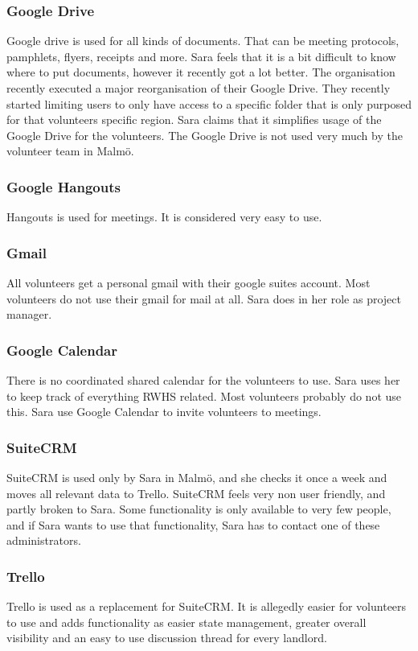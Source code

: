 \subsubsection{Google Drive}
Google drive is used for all kinds of documents. That can be meeting protocols, pamphlets, flyers, receipts and more. Sara feels that it is a bit difficult to know where to put documents, however it recently got a lot better. The organisation recently executed a major reorganisation of their Google Drive. They recently started limiting users to only have access to a specific folder that is only purposed for that volunteers specific region. Sara claims that it simplifies usage of the Google Drive for the volunteers. The Google Drive is not used very much by the volunteer team in Malmö.

\subsubsection{Google Hangouts}
Hangouts is used for meetings. It is considered very easy to use.

\subsubsection{Gmail}
All volunteers get a personal gmail with their google suites account. Most volunteers do not use their gmail for mail at all. Sara does in her role as project manager.

\subsubsection{Google Calendar}
There is no coordinated shared calendar for the volunteers to use. Sara uses her to keep track of everything RWHS related. Most volunteers probably do not use this. Sara use Google Calendar to invite volunteers to meetings.

\subsubsection{SuiteCRM}
SuiteCRM is used only by Sara in Malmö, and she checks it once a week and moves all relevant data to Trello. SuiteCRM feels very non user friendly, and partly broken to Sara. Some functionality is only available to very few people, and if Sara wants to use that functionality, Sara has to contact one of these administrators.

\subsubsection{Trello}
Trello is used as a replacement for SuiteCRM. It is allegedly easier for volunteers to use and adds functionality as easier state management, greater overall visibility and an easy to use discussion thread for every landlord.

